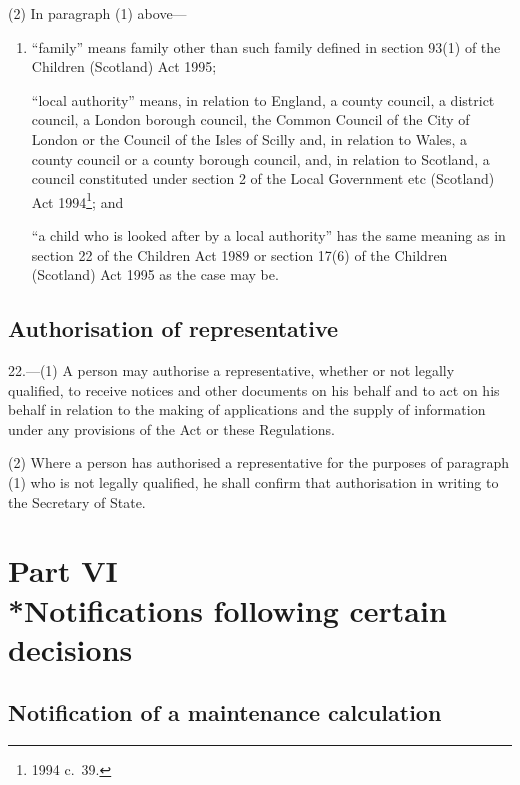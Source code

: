\documentclass[12pt,a4paper]{article}
\begin{document}
(2) In paragraph (1) above—
\begin{enumerate}\item[]
“family” means family other than such family defined in section 93(1) of the Children (Scotland) Act 1995;

\pagebreak[3]

“local authority” means, in relation to England, a county council, a district council, a London borough council, the Common Council of the City of London or the Council of the Isles of Scilly and, in relation to Wales, a county council or a county borough council, and, in relation to Scotland, a council constituted under section 2 of the Local Government etc (Scotland) Act 1994\footnote{1994 c.\ 39.}; and

“a child who is looked after by a local authority” has the same meaning as in section 22 of the Children Act 1989 or section 17(6) of the Children (Scotland) Act 1995 as the case may be.
\end{enumerate}

\subsection[22. Authorisation of representative]{Authorisation of representative}

22.---(1)  A person may authorise a representative, whether or not legally qualified, to receive notices and other documents on his behalf and to act on his behalf in relation to the making of applications and the supply of information under any provisions of the Act or these Regulations.

(2) Where a person has authorised a representative for the purposes of paragraph (1) who is not legally qualified, he shall confirm that authorisation in writing to the Secretary of State.

\section[Part VI --- Notifications following certain decisions]{Part VI\\*Notifications following certain decisions}

\renewcommand\parthead{--- Part VI}

\subsection[23. Notification of a maintenance calculation]{Notification of a maintenance calculation}
\end{document}
